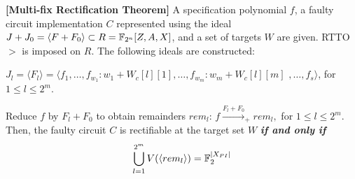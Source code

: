 \begin{Theorem}{\bf [Multi-fix Rectification Theorem]}\label{Thm:rect}
A specification polynomial $f$, a faulty circuit
implementation $C$ represented using the ideal 
$J +J_0 = \langle F + F_0\rangle \subset R = {\mathbb{F}}_{2^n}[Z,A,X]$,
 and a set of targets $W$ are given. 
RTTO $>$ is imposed on $R$. 
The following ideals are constructed:  
\bi
\item $J_l = \langle F_l\rangle =\langle f_1,\dots,f_{w_1}:w_1+W_c[l][1],
	\dots,f_{w_m}:w_m+W_c[l][m]$ $,\dots,f_s\rangle$, for $1 \leq l \leq 2^m$. 
\ei

Reduce $f$ by $F_l + F_0$ to obtain remainders $rem_l$: 
$f\xrightarrow{F_l +  F_{0}}_+ rem_l,$  for $1 \leq l \leq 2^m$.
Then, the faulty circuit $C$ is rectifiable at the target set $W$ {\bf\textit{if
   and only if}} 
\begin{equation}
   \bigcup\limits_{l=1}^{2^m}V(\langle rem_l \rangle) = {\mathbb{F}}_{2}^{|X_{PI}|}  
   \label{eq:rcheck}
\end{equation}

\end{Theorem}

